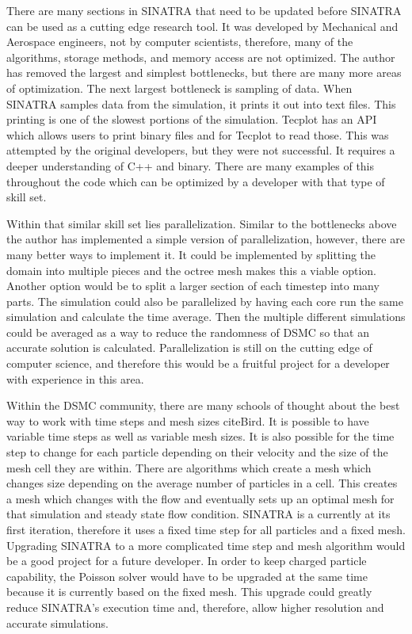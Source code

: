 There are many sections in SINATRA that need to be updated before SINATRA can be used as a cutting edge research tool. It was developed by Mechanical and Aerospace engineers, not by computer scientists, therefore, many of the algorithms, storage methods, and memory access are not optimized. The author has removed the largest and simplest bottlenecks, but there are many more areas of optimization. The next largest bottleneck is sampling of data. When SINATRA samples data from the simulation, it prints it out into text files. This printing is one of the slowest portions of the simulation. Tecplot has an API which allows users to print binary files and for Tecplot to read those. This was attempted by the original developers, but they were not successful. It requires a deeper understanding of C++ and binary. There are many examples of this throughout the code which can be optimized by a developer with that type of skill set. \par

\indent Within that similar skill set lies parallelization. Similar to the bottlenecks above the author has implemented a simple version of parallelization, however, there are many better ways to implement it. It could be implemented by splitting the domain into multiple pieces and the octree mesh makes this a viable option. Another option would be to split a larger section of each timestep into many parts. The simulation could also be parallelized by having each core run the same simulation and calculate the time average. Then the multiple different simulations could be averaged as a way to reduce the randomness of DSMC so that an accurate solution is calculated. Parallelization is still on the cutting edge of computer science, and therefore this would be a fruitful project for a developer with experience in this area. \par

\indent Within the DSMC community, there are many schools of thought about the best way to work with time steps and mesh sizes citeBird. It is possible to have variable time steps as well as variable mesh sizes. It is also possible for the time step to change for each particle depending on their velocity and the size of the mesh cell they are within. There are algorithms which create a mesh which changes size depending on the average number of particles in a cell. This creates a mesh which changes with the flow and eventually sets up an optimal mesh for that simulation and steady state flow condition. SINATRA is a currently at its first iteration, therefore it uses a fixed time step for all particles and a fixed mesh. Upgrading SINATRA to a more complicated time step and mesh algorithm would be a good project for a future developer. In order to keep charged particle capability, the Poisson solver would have to be upgraded at the same time because it is currently based on the fixed mesh. This upgrade could greatly reduce SINATRA’s execution time and, therefore, allow higher resolution and accurate simulations. \par

